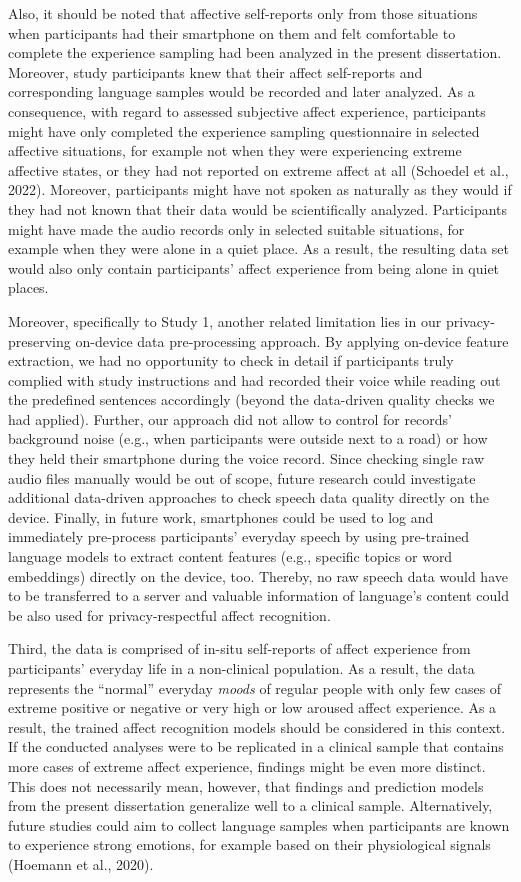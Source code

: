 \documentclass[
  man,floatsintext]{apa6}
\begin{document}
Also, it should be noted that affective self-reports only from those situations when participants had their smartphone on them and felt comfortable to complete the experience sampling had been analyzed in the present dissertation. Moreover, study participants knew that their affect self-reports and corresponding language samples would be recorded and later analyzed. As a consequence, with regard to assessed subjective affect experience, participants might have only completed the experience sampling questionnaire in selected affective situations, for example not when they were experiencing extreme affective states, or they had not reported on extreme affect at all (Schoedel et al., 2022). Moreover, participants might have not spoken as naturally as they would if they had not known that their data would be scientifically analyzed. Participants might have made the audio records only in selected suitable situations, for example when they were alone in a quiet place. As a result, the resulting data set would also only contain participants' affect experience from being alone in quiet places.

Moreover, specifically to Study 1, another related limitation lies in our privacy-preserving on-device data pre-processing approach. By applying on-device feature extraction, we had no opportunity to check in detail if participants truly complied with study instructions and had recorded their voice while reading out the predefined sentences accordingly (beyond the data-driven quality checks we had applied). Further, our approach did not allow to control for records' background noise (e.g., when participants were outside next to a road) or how they held their smartphone during the voice record. Since checking single raw audio files manually would be out of scope, future research could investigate additional data-driven approaches to check speech data quality directly on the device. Finally, in future work, smartphones could be used to log and immediately pre-process participants' everyday speech by using pre-trained language models to extract content features (e.g., specific topics or word embeddings) directly on the device, too. Thereby, no raw speech data would have to be transferred to a server and valuable information of language's content could be also used for privacy-respectful affect recognition.

Third, the data is comprised of in-situ self-reports of affect experience from participants' everyday life in a non-clinical population. As a result, the data represents the ``normal'' everyday \emph{moods} of regular people with only few cases of extreme positive or negative or very high or low aroused affect experience. As a result, the trained affect recognition models should be considered in this context. If the conducted analyses were to be replicated in a clinical sample that contains more cases of extreme affect experience, findings might be even more distinct. This does not necessarily mean, however, that findings and prediction models from the present dissertation generalize well to a clinical sample. Alternatively, future studies could aim to collect language samples when participants are known to experience strong emotions, for example based on their physiological signals (Hoemann et al., 2020).
\end{document}
